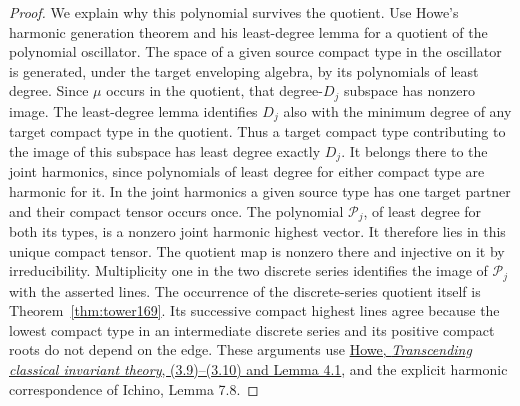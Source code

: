 \documentclass[a4paper,11pt]{article}
\theoremstyle{definition}
\theoremstyle{remark}
\numberwithin{equation}{section}
\begin{document}
\begin{proof}
We explain why this polynomial survives the quotient. Use Howe's
harmonic generation theorem and his least-degree lemma for a
quotient of the polynomial oscillator. The space of a given
source compact type in the oscillator is generated, under the
target enveloping algebra, by its polynomials of least degree.
Since \(\mu\) occurs in the quotient, that degree-\(D_j\) subspace
has nonzero image. The least-degree lemma identifies \(D_j\)
also with the minimum degree of any target compact type in
the quotient. Thus a target compact type contributing to the
image of this subspace has least degree exactly \(D_j\). It
belongs there to the joint harmonics, since polynomials of
least degree for either compact type are harmonic for it.
In the joint harmonics a given source type has one target
partner and their compact tensor occurs once. The polynomial
\(\mathcal P_j\), of least degree for both its types, is a nonzero joint
harmonic highest vector. It therefore lies in this unique
compact tensor. The quotient map is nonzero there and injective
on it by irreducibility. Multiplicity one in the two discrete
series identifies the image of \(\mathcal P_j\) with the asserted lines.
The occurrence of the discrete-series quotient itself is
Theorem~\ref{thm:tower169}. Its successive compact highest
lines agree because the lowest compact type in an intermediate
discrete series and its positive compact roots do not depend
on the edge. These arguments use
\href{https://www.math.utah.edu/~ptrapa/math-library/howe/howe-transcending-1989.pdf}{Howe,
\emph{Transcending classical invariant theory}, (3.9)--(3.10)
and Lemma 4.1}, and the explicit harmonic correspondence of
Ichino, Lemma 7.8.
\end{proof}
\end{document}
